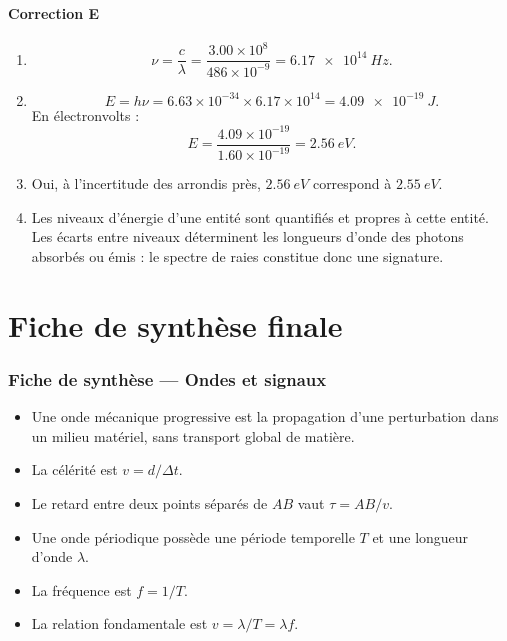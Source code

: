 \documentclass[11pt,a4paper]{article}
\begin{document}
\subsection*{Correction E}
\begin{enumerate}[label=\arabic*)]
  \item
  \[
  \nu=\frac{c}{\lambda}=\frac{3.00\times10^8}{486\times10^{-9}}=\SI{6.17e14}{Hz}.
  \]
  \item
  \[
  E=h\nu=6.63\times10^{-34}\times6.17\times10^{14}=\SI{4.09e-19}{J}.
  \]
  En électronvolts :
  \[
  E=\frac{4.09\times10^{-19}}{1.60\times10^{-19}}=\SI{2.56}{eV}.
  \]
  \item Oui, à l'incertitude des arrondis près, $\SI{2.56}{eV}$ correspond à $\SI{2.55}{eV}$.
  \item Les niveaux d'énergie d'une entité sont quantifiés et propres à cette entité. Les écarts entre niveaux déterminent les longueurs d'onde des photons absorbés ou émis : le spectre de raies constitue donc une signature.
\end{enumerate}

\newpage

\part{Fiche de synthèse finale}

\section*{Fiche de synthèse — Ondes et signaux}

\begin{tcolorbox}[colframe=bleuprepa,colback=blue!3!white,title={1. Ondes mécaniques}]
\begin{itemize}[label=$\triangleright$]
  \item Une onde mécanique progressive est la propagation d'une perturbation dans un milieu matériel, sans transport global de matière.
  \item La célérité est $v=d/\Delta t$.
  \item Le retard entre deux points séparés de $AB$ vaut $\tau=AB/v$.
  \item Une onde périodique possède une période temporelle $T$ et une longueur d'onde $\lambda$.
  \item La fréquence est $f=1/T$.
  \item La relation fondamentale est $v=\lambda/T=\lambda f$.
\end{itemize}
\end{tcolorbox}
\end{document}
